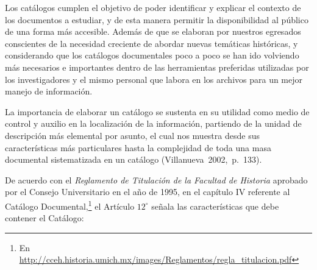 Los catálogos cumplen el objetivo de poder identificar y explicar el 
contexto de los documentos a estudiar, y de esta manera permitir la 
disponibilidad al público de una forma más accesible. Además de que se 
elaboran por nuestros egresados conscientes de la necesidad creciente 
de abordar nuevas temáticas históricas, y considerando que los 
catálogos documentales poco a poco se han ido volviendo más necesarios 
e importantes dentro de las herramientas preferidas utilizadas por los 
investigadores y el mismo personal que labora en los archivos para un 
mejor manejo de información.

\begin{sloppypar}
La importancia de elaborar un catálogo se sustenta en su utilidad como 
medio de control y auxilio en la localización de la información, 
partiendo de la unidad de descripción más elemental por asunto, el cual 
nos muestra desde sus características más particulares hasta la 
complejidad de toda una masa documental sistematizada en un 
catálogo \mbox{(Villanueva~2002,~p.~133)}.
\end{sloppypar}

De acuerdo con el \textit{Reglamento de Titulación de la Facultad de 
Historia} aprobado por el Consejo Universitario en el año de 1995, en 
el capítulo IV referente al Catálogo Documental,\footnote{En \url{http://cceh.historia.umich.mx/images/Reglamentos/regla_titulacion.pdf}} el 
Artículo $12^\circ$ señala las características que debe contener 
el Catálogo:

